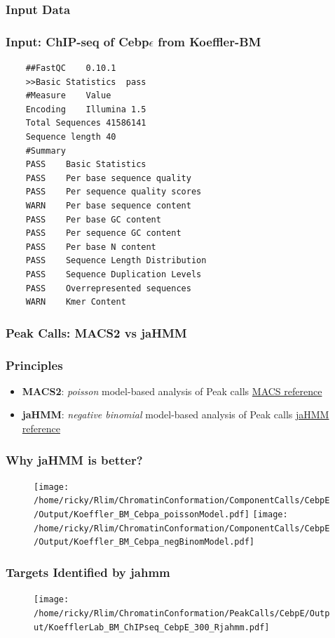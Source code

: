 \documentclass[notes]{beamer}
\begin{document}
\subsubsection{Input Data}
\begin{frame}
    \frametitle{Input: ChIP-seq of Cebp$\epsilon$ from Koeffler-BM}
    \begin{lstlisting}
    ##FastQC	0.10.1
    >>Basic Statistics	pass
    #Measure	Value	
    Encoding	Illumina 1.5	
    Total Sequences	41586141	
    Sequence length	40	
    #Summary
    PASS	Basic Statistics	
    PASS	Per base sequence quality	
    PASS	Per sequence quality scores	
    WARN	Per base sequence content	
    PASS	Per base GC content	
    PASS	Per sequence GC content	
    PASS	Per base N content	
    PASS	Sequence Length Distribution	
    PASS	Sequence Duplication Levels	
    PASS	Overrepresented sequences	
    WARN	Kmer Content	
    \end{lstlisting}
\end{frame}
    

\subsubsection{Peak Calls: MACS2 vs jaHMM}
\begin{frame}
    \frametitle{Principles}
    \begin{itemize}
        \item \textbf{MACS2}: \textit{poisson} model-based analysis of Peak calls \href{http://www.ncbi.nlm.nih.gov/pmc/articles/PMC3868217/}{MACS reference}
        \item \textbf{jaHMM}: \textit{negative binomial} model-based analysis of Peak calls \href{http://arxiv.org/pdf/1405.5467.pdf}{jaHMM reference}
    \end{itemize}
\end{frame}

\begin{frame}[plain]
    \frametitle{Why jaHMM is better?}
    \begin{figure}
        \texttt{[image: /home/ricky/Rlim/ChromatinConformation/ComponentCalls/CebpE/Output/Koeffler\_BM\_Cebpa\_poissonModel.pdf]}
        \texttt{[image: /home/ricky/Rlim/ChromatinConformation/ComponentCalls/CebpE/Output/Koeffler\_BM\_Cebpa\_negBinomModel.pdf]}
    \end{figure}
\end{frame}

\begin{frame}[plain]
    \frametitle{Targets Identified by jahmm}
    \begin{figure}
        \texttt{[image: /home/ricky/Rlim/ChromatinConformation/PeakCalls/CebpE/Output/KoefflerLab\_BM\_ChIPseq\_CebpE\_300\_Rjahmm.pdf]}
    \end{figure}
\end{frame}
\end{document}
